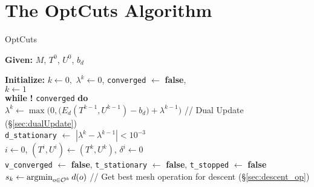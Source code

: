 
\section{The OptCuts Algorithm}%
\label{sec:imp}

\begin{algorithm}[h!]
\label{alg:OptCuts}
\caption{OptCuts}

\textbf{Given:} $M$, $T^0$, $U^0$, $b_d$ 

\textbf{Initialize:} $k \leftarrow 0,$ \hspace{2pt} $\lambda^k \leftarrow 0$, \texttt{converged} $\leftarrow$ \textbf{false}, \\

$k \leftarrow 1$ \\

\textbf{while} \hspace{2pt} \textbf{!}  \texttt{converged} \hspace{2pt} \textbf{do} \\


\hspace{10pt} $\lambda^{k} \leftarrow \max\big(0,\big( E_{d}(T^{k-1}, U^{k-1}) -b_d \big) + \lambda^{k-1}\big)$ \hspace{10pt} // Dual Update (\S\ref{sec:dualUpdate})\\
\hspace{10pt} \texttt{d\_stationary} $\leftarrow$ $| \lambda^{k} - \lambda^{k-1} | < 10^{-3}$ \\

\hspace{10pt} $i \leftarrow 0$, $(T^{i},U^{i}) \leftarrow (T^{k},U^{k})$, \hspace{2pt} $\delta^{i} \leftarrow 0$ \\
\hspace{10pt} \texttt{v\_converged} $\leftarrow$ \textbf{false}, \texttt{t\_stationary} $\leftarrow$ \textbf{false}, \texttt{t\_stopped} $\leftarrow$ \textbf{false} \\
\hspace{10pt} $s_k \leftarrow \operatorname*{argmin}_{o \in \mathcal{O}^k} d(o)$ \hspace{10pt}//  Get best mesh operation for descent (\S\ref{sec:descent_op})\\


\end{algorithm}
